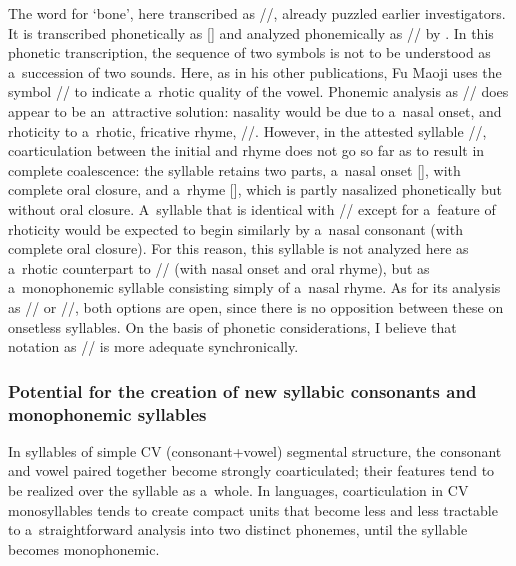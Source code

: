 		The word for ‘bone’, here transcribed as //, already puzzled earlier investigators. It is transcribed phonetically as []
		and analyzed phonemically as // by \citet[25]{fu1983}. In this phonetic
		transcription, the sequence of two symbols is not to be understood as a~succession of two sounds. Here, as in his other publications, Fu Maoji uses the symbol // to indicate a~rhotic quality
		of the vowel. Phonemic analysis as // does appear to be an~attractive
		solution: nasality would be due to a~nasal onset, and rhoticity to a~rhotic, fricative rhyme,
		//. However, in the attested syllable //, {coarticulation} between the initial and
		rhyme does not go so far as to result in complete coalescence: the syllable retains two parts, a~nasal onset
		[], with complete oral closure, and a~rhyme [], which is partly nasalized phonetically but without oral
		closure. A~syllable that is identical with // except for a~feature of rhoticity would be
		expected to begin similarly by a~nasal consonant (with complete oral closure). For this reason, this
		syllable is not analyzed here as a~rhotic counterpart to // (with nasal onset and oral
		rhyme), but as a~monophonemic syllable consisting simply of a~nasal rhyme. As for its analysis as
		// or //, both options are open, since there is no opposition between these on
		onsetless syllables. On the basis of phonetic considerations, I believe that notation as //
		is more adequate synchronically.
		
		
		\subsubsection{Potential for the creation of new syllabic consonants and monophonemic syllables}
		\label{sec:potentialforthecreationofnewsyllabicconsonantsandmonophonemicsyllables}
		
		In syllables of simple CV (consonant+vowel) segmental structure, the consonant and vowel paired
		together become strongly coarticulated; their features tend to be realized over the syllable as
		a~whole. %
		In  languages, {coarticulation}
		in CV monosyllables tends to create compact units that become less and less tractable to
		a~straightforward analysis into two distinct phonemes, until the syllable becomes monophonemic.
		
